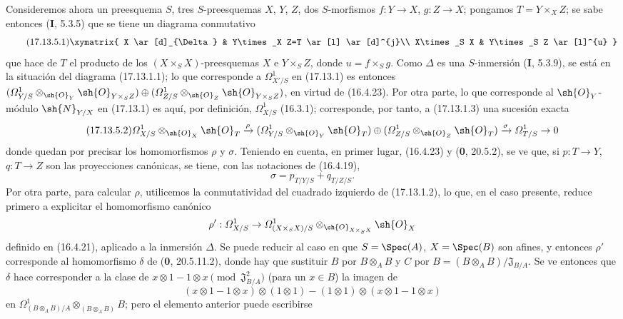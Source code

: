 \begin{env}[17.13.5]
\label{IV.17.13.5}
Consideremos ahora un preesquema $S$, tres $S$-preesquemas $X$, $Y$, $Z$, dos $S$-morfismos $f:Y\to X$, $g:Z\to X$; pongamos $T=Y\times_XZ$; se sabe entonces (\textbf I, 5.3.5) que se tiene un diagrama conmutativo
\[
\label{IV.17.13.5.1}
\tag{17.13.5.1}
\xymatrix{
  X \ar[d]_{\Delta} & Y\times_X Z=T \ar[l] \ar[d]^{j}\\
  X\times_S X & Y\times_S Z \ar[l]^{u}
}
\]
que hace de $T$ el producto de los $(X\times_SX)$-preesquemas $X$ e $Y\times_SZ$, donde $u=f\times_Sg$. Como $\Delta$ es una $S$-inmersión (\textbf I, 5.3.9), se está en la situación del diagrama (17.13.1.1); lo que corresponde a $\varOmega^1_{X'/S}$ en (17.13.1) es entonces $(\varOmega^1_{Y/S}\otimes_{\sh{O}_Y}\sh{O}_{Y\times_SZ})\oplus(\varOmega^1_{Z/S}\otimes_{\sh{O}_Z}\sh{O}_{Y\times_SZ})$, en virtud de (16.4.23). Por otra parte, lo que corresponde al $\sh{O}_Y$-módulo $\sh{N}_{Y/X}$ en (17.13.1) es aquí, por definición, $\varOmega^1_{X/S}$ (16.3.1); corresponde, por tanto, a (17.13.1.3) una sucesión exacta
\[
\label{IV.17.13.5.2}
\tag{17.13.5.2}
\varOmega^1_{X/S}\otimes_{\sh{O}_X}\sh{O}_T\xrightarrow{\rho}
(\varOmega^1_{Y/S}\otimes_{\sh{O}_Y}\sh{O}_T)\oplus
(\varOmega^1_{Z/S}\otimes_{\sh{O}_Z}\sh{O}_T)
\xrightarrow{\sigma}\varOmega^1_{T/S}\to0
\]
donde quedan por precisar los homomorfismos $\rho$ y $\sigma$. Teniendo en cuenta, en primer lugar, (16.4.23) y (\textbf 0, 20.5.2), se ve que, si $p:T\to Y$, $q:T\to Z$ son las proyecciones canónicas, se tiene, con las notaciones de (16.4.19),
\[
\label{IV.17.13.5.3}
\tag{17.13.5.3}
\sigma=p_{T/Y/S}+q_{T/Z/S}.
\]
Por otra parte, para calcular $\rho$, utilicemos la conmutatividad del cuadrado izquierdo de (17.13.1.2), lo que, en el caso presente, reduce primero a explicitar el homomorfismo canónico
\[
\rho':\varOmega^1_{X/S}\to\varOmega^1_{(X\times_SX)/S}\otimes_{\sh{O}_{X\times_SX}}\sh{O}_X
\]
definido en (16.4.21), aplicado a la inmersión $\Delta$. Se puede reducir al caso en que $S=\Spec(A)$, $X=\Spec(B)$ son afines, y entonces $\rho'$ corresponde al homomorfismo $\delta$ de (\textbf 0, 20.5.11.2), donde hay que sustituir $B$ por $B\otimes_AB$ y $C$ por $B=(B\otimes_AB)/\mathfrak J_{B/A}$. Se ve entonces que $\delta$ hace corresponder a la clase de $x\otimes1-1\otimes x\pmod{\mathfrak J_{B/A}^2}$ (para un $x\in B$) la imagen de
\[
(x\otimes1-1\otimes x)\otimes(1\otimes1)-(1\otimes1)\otimes(x\otimes1-1\otimes x)
\]
en $\Omega^1_{(B\otimes_AB)/A}\otimes_{(B\otimes_AB)}B$; pero el elemento anterior puede escribirse
\[
\begin{split}

\end{split}\]
\end{env}
